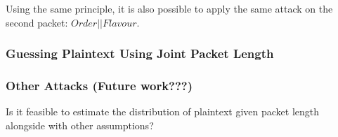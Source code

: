 \begin{example}
Using the same principle, it is also possible to apply the same attack on the second packet: $Order || Flavour$.
\end{example}

\subsubsection{Guessing Plaintext Using Joint Packet Length}

\subsubsection{Other Attacks (Future work???)}
Is it feasible to estimate the distribution of plaintext given packet length alongside with other assumptions?
